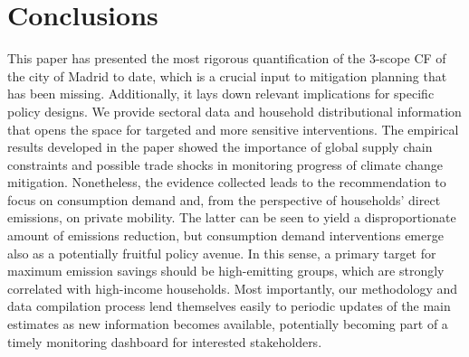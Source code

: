 \documentclass[
  10pt,
  twocolumn]{aft}
\begin{document}
\section{Conclusions}\label{sec-conclusions}

This paper has presented the most rigorous quantification of the 3-scope
CF of the city of Madrid to date, which is a crucial input to mitigation
planning that has been missing. Additionally, it lays down relevant
implications for specific policy designs. We provide sectoral data and
household distributional information that opens the space for targeted
and more sensitive interventions. The empirical results developed in the
paper showed the importance of global supply chain constraints and
possible trade shocks in monitoring progress of climate change
mitigation. Nonetheless, the evidence collected leads to the
recommendation to focus on consumption demand and, from the perspective
of households' direct emissions, on private mobility. The latter can be
seen to yield a disproportionate amount of emissions reduction, but
consumption demand interventions emerge also as a potentially fruitful
policy avenue. In this sense, a primary target for maximum emission
savings should be high-emitting groups, which are strongly correlated
with high-income households. Most importantly, our methodology and data
compilation process lend themselves easily to periodic updates of the
main estimates as new information becomes available, potentially
becoming part of a timely monitoring dashboard for interested
stakeholders.
\end{document}
